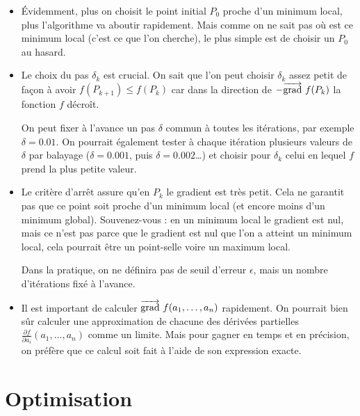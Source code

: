 	\begin{itemize}
		\item \'Evidemment, plus on choisit le point initial $P_0$ proche d'un minimum local, plus l'algorithme va aboutir rapidement. Mais comme on ne sait pas où est ce minimum local (c'est ce que l'on cherche), le plus simple est de choisir un $P_0$ au hasard.
		
		\item Le choix du pas $\delta_k$ est crucial. On sait que l'on peut choisir $\delta_k$ assez petit de façon à avoir $f(P_{k+1}) \le f(P_k)$ car dans la direction de $-\overrightarrow{\textup{grad}}\  f(P_k)$ la fonction $f$ décroît.
		
		
		On peut fixer à l'avance un pas $\delta$ commun à toutes les itérations, par exemple $\delta = 0.01$. On pourrait également tester à chaque itération plusieurs valeurs de $\delta$ par balayage ($\delta = 0.001$, puis $\delta=0.002$\ldots) et choisir pour $\delta_k$ celui en lequel $f$ prend la plus petite valeur.
		
		\item Le critère d'arrêt assure qu'en $P_k$ le gradient est très petit. Cela ne garantit pas que ce point soit proche d'un minimum local (et encore moins d'un minimum global). Souvenez-vous : en un minimum local le gradient est nul, mais ce n'est pas parce que le gradient est nul que l'on a atteint un minimum local, cela pourrait être un point-selle voire un maximum local.
		
		Dans la pratique, on ne définira pas de seuil d'erreur $\epsilon$, mais un nombre d'itérations fixé à l'avance.
		
		\item Il est important de calculer $\overrightarrow{\textup{grad}}\  f(a_1,\ldots,a_n)$ rapidement. On pourrait bien sûr calculer une approximation de chacune des dérivées partielles $\frac{\partial f}{\partial a_i}(a_1,\ldots,a_n)$ comme un limite. Mais pour gagner en temps et en précision, on préfère que ce calcul soit fait à l'aide de son expression exacte. 
		
	\end{itemize}




\section{Optimisation}

